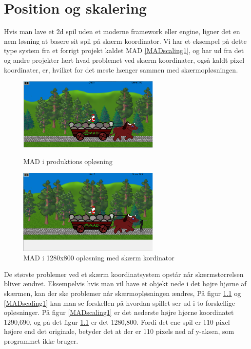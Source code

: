 \documentclass[Main.tex]{PositionOgSkalering}
\begin{document}
\chapter{Position og skalering}
Hvis man lave et  2d spil uden et moderne framework eller engine, ligner det en nem løsning at basere sit spil på skærm koordinator. Vi har et eksempel på dette type system fra et forrigt projekt kaldet MAD \ref{MADscaling1}, og har ud fra det og andre projekter lært hvad problemet ved skærm koordinater, også kaldt pixel koordinater, er, hvilket for det meste hænger sammen med skærmopløsningen.

\begin{figure}[h]
\centering
\parbox{7cm}{   
\includegraphics[width = 7cm]{billeder/MADscaling1}
\caption{MAD i produktions opløsning}    
\label{MADscaling1}}
\qquad
\begin{minipage}{7cm}
\includegraphics[width = 7cm]{billeder/MADscaling2}
\caption{MAD i 1280x800 opløsning med skærm kordinator}    
\label{MADscaling2}
\end{minipage}
\end{figure}

De største problemer ved et skærm koordinatsystem opstår når skærmstørrelsen bliver ændret.  Eksempelvis hvis man vil have et objekt nede i det højre hjørne af skærmen, kan der ske problemer når  skærmopløsningen ændres, På figur \ref{MADscaling2} og \ref{MADscaling1} kan man se forskellen på hvordan spillet ser ud i to forskellige opløsninger. På figur \ref{MADscaling1} er det nederste højre hjørne koordinatet 1290,690, og på det figur \ref{MADscaling2} er det 1280,800. Fordi det ene spil er 110 pixel højere end det originale, betyder det at der er 110 pixels ned af y-aksen, som programmet ikke bruger.
\end{document}
